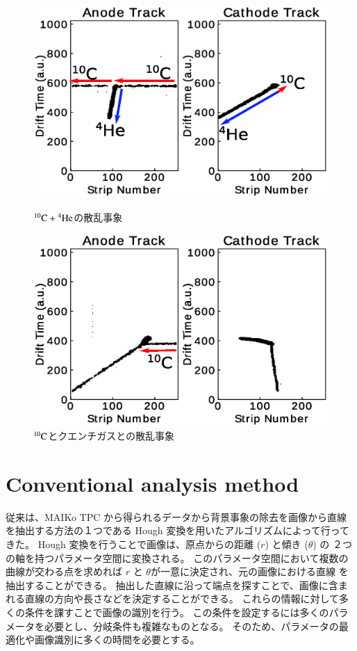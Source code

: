 \documentclass{jps-cp}
\begin{document}
\begin{figure}
  \centering
  \begin{minipage}{0.4\columnwidth}
    \centering
    \includegraphics[clip, width=0.9\columnwidth]{eps/true.eps}
    \caption{${}^{10}\rm{C}+{}^{4}\rm{He}$の散乱事象}
    \label{fig:true}
  \end{minipage}
  \begin{minipage}{0.4\columnwidth}
    \centering
    \includegraphics[clip, width=0.9\columnwidth]{eps/false.eps}
    \caption{${}^{10}\rm{C}$とクエンチガスとの散乱事象}
    \label{fig:false}
  \end{minipage}
\end{figure}

\section{Conventional analysis method}
従来は、MAIKo TPC から得られるデータから背景事象の除去を画像から直線を抽出する方法の１つである
Hough 変換を用いたアルゴリズムによって行ってきた。
Hough 変換を行うことで画像は、原点からの距離 ($r$) と傾き ($\theta$) の
２つの軸を持つパラメータ空間に変換される。
このパラメータ空間において複数の曲線が交わる点を求めれば
$r$ と $\theta$が一意に決定され、元の画像における直線
を抽出することができる。
抽出した直線に沿って端点を探すことで、画像に含まれる直線の方向や長さなどを決定することができる。
これらの情報に対して多くの条件を課すことで画像の識別を行う。
この条件を設定するには多くのパラメータを必要とし、分岐条件も複雑なものとなる。
そのため、パラメータの最適化や画像識別に多くの時間を必要とする。
\end{document}
